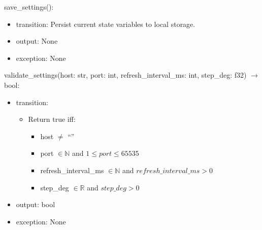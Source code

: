 \documentclass[12pt, titlepage]{article}
\begin{document}
\noindent save\_settings():
\begin{itemize}
  \item transition: Persist current state variables to local storage.
  \item output: None
  \item exception: None
\end{itemize}

\noindent validate\_settings(host: str, port: int, refresh\_interval\_ms: int, step\_deg: f32) $\rightarrow$ bool:
\begin{itemize}
  \item transition:
        \begin{itemize}
          \item Return true iff:
                \begin{itemize}
                  \item host $\neq$ ``''
                  \item port $\in \mathbb{N}$ and $1 \le port \le 65535$
                  \item refresh\_interval\_ms $\in \mathbb{N}$ and $refresh\_interval\_ms > 0$
                  \item step\_deg $\in \mathbb{R}$ and $step\_deg > 0$
                \end{itemize}
        \end{itemize}
  \item output: bool
  \item exception: None
\end{itemize}
\end{document}

